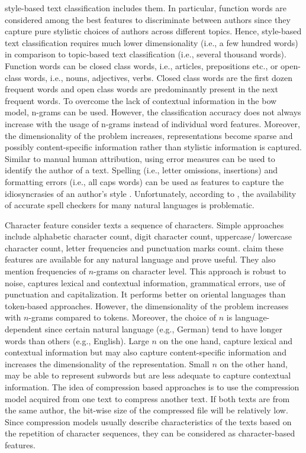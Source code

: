 style-based text classification includes them.
In particular, function words are considered among the best features to discriminate between authors 
since they capture pure stylistic choices of authors across different topics.
Hence, style-based text classification requires much lower dimensionality (i.e., a few hundred words) 
in comparison to topic-based text classification (i.e., several thousand words).
Function words can be closed class words, i.e., articles, prepositions etc., 
or open-class words, i.e., nouns, adjectives, verbs.
Closed class words are the first dozen frequent words and 
open class words are predominantly present in the next frequent words.
To overcome the lack of contextual information in the \ac{bow} model, 
n-grams can be used.
However, the classification accuracy does not always increase with the usage of n-grams instead of individual word features.
Moreover, the dimensionality of the problem increases, representations become sparse and possibly content-specific information rather than stylistic information is captured.
Similar to manual human attribution, using error measures can be used to identify the author of a text.
Spelling (i.e., letter omissions, insertions) and formatting errors (i.e., all caps words) can be used as features 
to capture the idiosyncrasies of an author's style \cite{elmanarelbouanani_authorship_2014,bevendorff_overview_2024}.
Unfortunately, according to \cite{stamatatos_survey_2009}, the availability of accurate spell checkers for many natural languages is problematic.


Character feature consider texts a sequence of characters.
Simple approaches include alphabetic character count, digit character count, uppercase/ lowercase character count, letter frequencies and punctuation marks count.
\citet{stamatatos_survey_2009} claim these features are available for any natural language and prove useful.
They also mention frequencies of $n$-grams on character level.
This approach is robust to noise, captures lexical and contextual information, grammatical errors, use of punctuation and capitalization.
It performs better on oriental languages than token-based approaches.
However, the dimensionality of the problem increases with $n$-grams compared to tokens.
Moreover, the choice of $n$ is language-dependent since certain natural language (e.g., German) tend to have longer words than others (e.g., English).
Large $n$ on the one hand, capture lexical and contextual information but may also capture content-specific information and increases the dimensionality of the representation.
Small $n$ on the other hand, may be able to represent subwords but are less adequate to capture contextual information.
The idea of compression based approaches is to use the compression model acquired from one text to compress another text. 
If both texts are from the same author, the bit-wise size of the compressed file will be relatively low.
Since compression models usually describe characteristics of the texts based on the repetition of character sequences, 
they can be considered as character-based features. 


